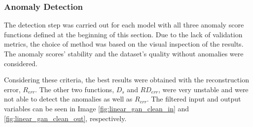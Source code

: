 \subsubsection*{Anomaly Detection}
The detection step was carried out for each model with all three anomaly score functions defined at the beginning of this section. Due to the lack of validation metrics, the choice of method was based on the visual inspection of the results. The anomaly scores' stability and the dataset's quality without anomalies were considered.

Considering these criteria, the best results were obtained with the reconstruction error, $R_{err}$. The other two functions, $D_{s}$ and $RD_{err}$, were very unstable and were not able to detect the anomalies as well as $R_{err}$. The filtered input and output variables can be seen in Image \ref{fig:linear_gan_clean_in} and \ref{fig:linear_gan_clean_out}, respectively.


